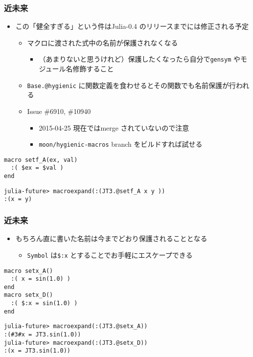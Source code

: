 \begin{frame}[containsverbatim]
\frametitle{近未来}
\begin{itemize}
  \item この「健全すぎる」という件はJulia-0.4 のリリースまでには修正される予定
    \begin{itemize}
      \item マクロに渡された式中の名前が保護されなくなる
        \begin{itemize}
          \item （あまりないと思うけれど）保護したくなったら自分で\verb|gensym| やモジュール名修飾すること
        \end{itemize}
      \item \verb|Base.@hygienic| に関数定義を食わせるとその関数でも名前保護が行われる
      \item Issue \#6910, \#10940
      \begin{itemize}
        \item 2015-04-25 現在ではmerge されていないので注意
        \item \verb|moon/hygienic-macros| branch をビルドすれば試せる
      \end{itemize}
    \end{itemize}
\end{itemize}
\begin{lstlisting}
macro setf_A(ex, val)
  :( $ex = $val )
end
\end{lstlisting}
\begin{lstlisting}
julia-future> macroexpand(:(JT3.@setf_A x y ))
:(x = y)
\end{lstlisting}
\end{frame}

\begin{frame}[containsverbatim]
\frametitle{近未来}
\begin{itemize}
  \item もちろん直に書いた名前は今までどおり保護されることとなる
    \begin{itemize}
      \item \verb|Symbol| は\verb|$:x| とすることでお手軽にエスケープできる
    \end{itemize}
\end{itemize}
\begin{lstlisting}
macro setx_A()
  :( x = sin(1.0) )
end
macro setx_D()
  :( $:x = sin(1.0) )
end
\end{lstlisting}
\begin{lstlisting}
julia-future> macroexpand(:(JT3.@setx_A))
:(#3#x = JT3.sin(1.0))
julia-future> macroexpand(:(JT3.@setx_D))
:(x = JT3.sin(1.0))
\end{lstlisting}
\end{frame}

